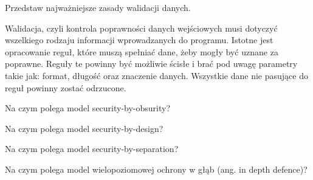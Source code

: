 \documentclass[answers,11pt]{exam}
\begin{document}
\begin{questions}
\question Przedstaw najważniejsze zasady walidacji danych.
\begin{solution}
Walidacja, czyli kontrola poprawności danych wejściowych musi dotyczyć wszelkiego rodzaju informacji wprowadzanych do programu. Istotne jest opracowanie reguł, które muszą spełniać dane, żeby mogły być uznane za poprawne. Reguły te powinny być możliwie ścisłe i brać pod uwagę parametry takie jak: format, długość oraz znaczenie danych. Wszystkie dane nie pasujące do reguł powinny zostać odrzucone.  
\end{solution}

\question Na czym polega model security-by-obsurity?

\question Na czym polega model security-by-design?

\question Na czym polega model security-by-separation?

\question Na czym polega model wielopoziomowej ochrony w głąb (ang. in depth defence)?


\end{questions}
\end{document}

